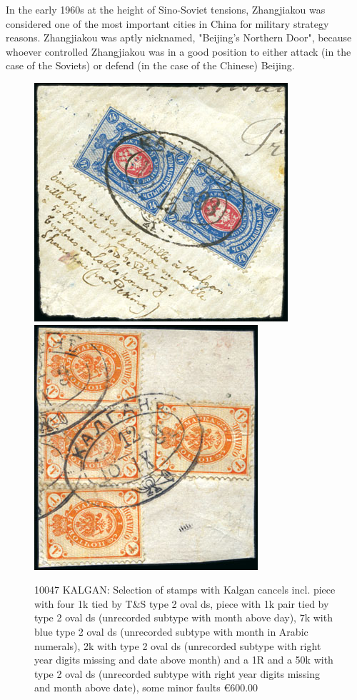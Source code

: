 In the early 1960s at the height of Sino-Soviet tensions, Zhangjiakou 
was considered one of the most important cities in China for military 
strategy reasons. Zhangjiakou was aptly nicknamed, "Beijing's Northern Door", 
because whoever controlled Zhangjiakou was in a good position to either attack 
(in the case of the Soviets) or defend (in the case of the Chinese) Beijing.

   

\begin{figure}[htbp]
\centering
\includegraphics[width=.60\textwidth]{../russian-post-offices-in-china/10047.jpg}
\includegraphics[width=.60\textwidth]{../russian-post-offices-in-china/10047-1.jpg}
\caption{
10047	KALGAN: Selection of stamps with Kalgan cancels incl. piece 
with four 1k tied by T\&S type 2 oval ds, piece with 1k pair tied by 
type 2 oval ds (unrecorded subtype with month above day), 7k with 
blue type 2 oval ds (unrecorded subtype with month in Arabic numerals), 
2k with type 2 oval ds (unrecorded subtype with right year digits missing 
and date above month) and a 1R and a 50k with type 2 oval ds 
(unrecorded subtype with right year digits missing and month above date), 
some minor faults
\euro 600.00
}  
\end{figure} 

